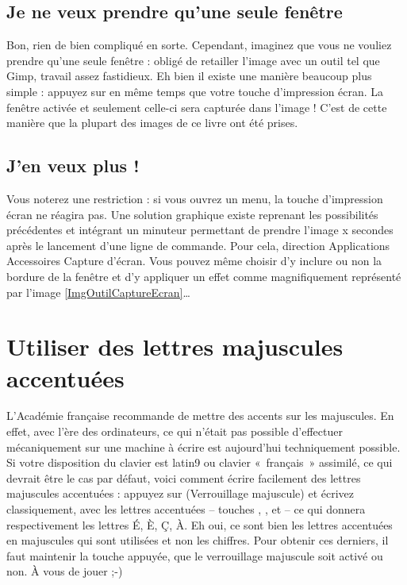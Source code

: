 \subsection{Je ne veux prendre qu'une seule fenêtre}
Bon, rien de bien compliqué en sorte. Cependant, imaginez que vous ne vouliez prendre qu'une seule fenêtre : obligé de retailler l'image avec un outil tel que Gimp, travail assez fastidieux. Eh bien il existe une manière beaucoup plus simple : appuyez sur  en même temps que votre touche d'impression écran. La fenêtre activée et seulement celle-ci sera capturée dans l'image ! C'est de cette manière que la plupart des images de ce livre ont été prises.
\subsection{J'en veux plus !}
Vous noterez une restriction : si vous ouvrez un menu, la touche d'impression écran  ne réagira pas. Une solution graphique existe reprenant les possibilités précédentes et intégrant un minuteur permettant de prendre l'image x secondes après le lancement d'une ligne de commande. Pour cela, direction Applications \FlecheDroite Accessoires \FlecheDroite Capture d'écran. Vous pouvez même choisir d'y inclure ou non la bordure de la fenêtre et d'y appliquer un effet comme magnifiquement représenté par l'image \ref{ImgOutilCaptureEcran}\ldots{}
\section{Utiliser des lettres majuscules accentuées}
\label{refMajAccent}
L'Académie française recommande de mettre des accents sur les majuscules. En effet, avec l'ère des ordinateurs, ce qui n'était pas possible d'effectuer mécaniquement sur une machine à écrire est aujourd'hui techniquement possible.\\
Si votre disposition du clavier est latin9 ou clavier «~français~» assimilé, ce qui devrait être le cas par défaut, voici comment écrire facilement des lettres majuscules accentuées : appuyez sur  (Verrouillage majuscule) et écrivez classiquement, avec les lettres accentuées -- touches  ,  ,   et   -- ce qui donnera respectivement les lettres É, È, Ç, À. Eh oui, ce sont bien les lettres accentuées  en majuscules qui sont utilisées et non les chiffres. Pour obtenir ces derniers, il faut maintenir la touche  appuyée, que le verrouillage majuscule soit activé ou non. À vous de jouer ;-)
